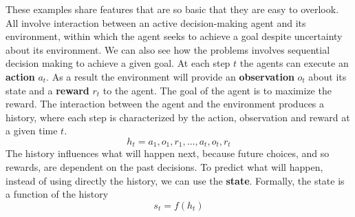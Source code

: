\documentclass[../main.tex]{subfiles}
\begin{document}
These examples share features that are so basic that they are easy to overlook. All involve interaction between an active decision-making agent and its environment, within which the agent seeks to achieve a goal despite uncertainty about its environment. We can also see how the problems involves sequential decision making to achieve a given goal.
At each step $t$ the agents can execute an \textbf{action} $a_t$. As a result the environment will provide an \textbf{observation} $o_t$ about its state and a \textbf{reward} $r_t$ to the agent. The goal of the agent is to maximize the reward. The interaction between the agent and the environment produces a history, where each step is characterized by the action, observation and reward at a given time $t$.
\begin{equation*}
    h_t = a_1,o_1,r_1, \dots, a_t,o_t,r_t
\end{equation*}
The history influences what will happen next, because future choices, and so rewards, are dependent on the past decisions. To predict what will happen, instead of using directly the history, we can use the \textbf{state}. Formally, the state is a function of the history
\begin{equation*}
    s_t = f(h_t)
\end{equation*}
\end{document}
